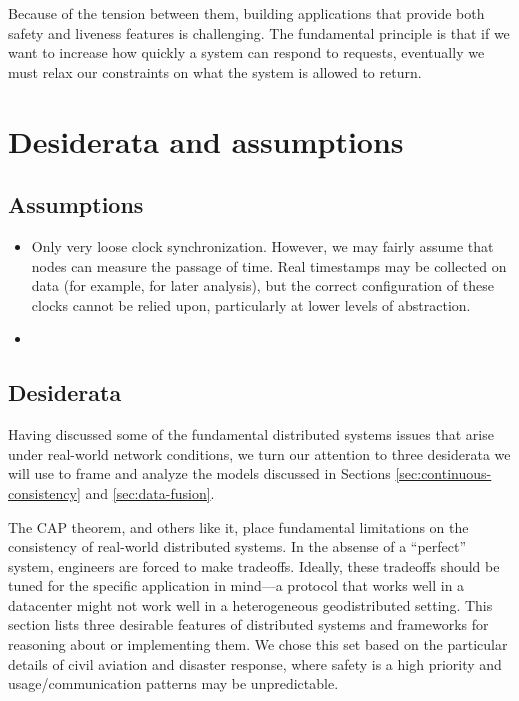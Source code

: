 \documentclass[]             %
{NASA}                       %
\theoremstyle{definition}
\begin{document}
Because of the tension between them, building applications that provide
both safety and liveness features is challenging. The fundamental
principle is that if we want to increase how quickly a system can
respond to requests, eventually we must relax our constraints on what
the system is allowed to return.

\newpage
\section{Desiderata and assumptions}
\label{sec:desiderata}

\subsection{Assumptions}
\label{ssec:assumptions}

\begin{itemize}
\item Only very loose clock synchronization. However, we may fairly assume that nodes can measure the passage of time. Real timestamps may be collected on data (for example, for later analysis), but the correct configuration of these clocks cannot be relied upon, particularly at lower levels of abstraction.
\item
\end{itemize}

\subsection{Desiderata}
\label{ssec:desiderata}

Having discussed some of the fundamental distributed systems issues that
arise under real-world network conditions, we turn our attention to
three desiderata we will use to frame and analyze the models discussed
in Sections \ref{sec:continuous-consistency} and \ref{sec:data-fusion}.

The CAP theorem, and others like it, place fundamental limitations on
the consistency of real-world distributed systems. In the absense of a
``perfect'' system, engineers are forced to make tradeoffs. Ideally,
these tradeoffs should be tuned for the specific application in mind---a
protocol that works well in a datacenter might not work well in a
heterogeneous geodistributed setting. This section lists three desirable
features of distributed systems and frameworks for reasoning about or
implementing them. We chose this set based on the particular details of
civil aviation and disaster response, where safety is a high priority
and usage/communication patterns may be unpredictable.
\end{document}
